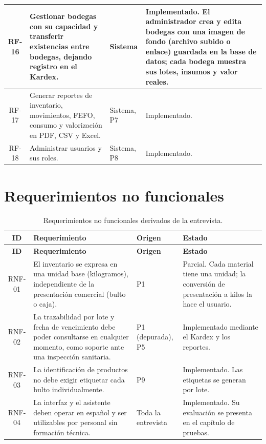 \begin{longtable}{|c|p{6.3cm}|p{1.9cm}|p{4.2cm}|}
RF-16 & Gestionar bodegas con su capacidad y transferir existencias entre bodegas, dejando registro en el Kardex. & Sistema & Implementado. El administrador crea y edita bodegas con una imagen de fondo (archivo subido o enlace) guardada en la base de datos; cada bodega muestra sus lotes, insumos y valor reales. \\ \hline
RF-17 & Generar reportes de inventario, movimientos, FEFO, consumo y valorización en PDF, CSV y Excel. & Sistema, P7 & Implementado. \\ \hline
RF-18 & Administrar usuarios y sus roles. & Sistema, P8 & Implementado. \\ \hline
\end{longtable}

\section{Requerimientos no funcionales}
\label{sec:req_rnf}

\begin{longtable}{|c|p{7.3cm}|p{1.6cm}|p{3.5cm}|}
\caption{Requerimientos no funcionales derivados de la entrevista.}
\label{tab:req_rnf}\\
\hline
\textbf{ID} & \textbf{Requerimiento} & \textbf{Origen} & \textbf{Estado} \\
\hline
\endfirsthead
\hline
\textbf{ID} & \textbf{Requerimiento} & \textbf{Origen} & \textbf{Estado} \\
\hline
\endhead
RNF-01 & El inventario se expresa en una unidad base (kilogramos), independiente de la presentación comercial (bulto o caja). & P1 & Parcial. Cada material tiene una unidad; la conversión de presentación a kilos la hace el usuario. \\ \hline
RNF-02 & La trazabilidad por lote y fecha de vencimiento debe poder consultarse en cualquier momento, como soporte ante una inspección sanitaria. & P1 (depurada), P5 & Implementado mediante el Kardex y los reportes. \\ \hline
RNF-03 & La identificación de productos no debe exigir etiquetar cada bulto individualmente. & P9 & Implementado. Las etiquetas se generan por lote. \\ \hline
RNF-04 & La interfaz y el asistente deben operar en español y ser utilizables por personal sin formación técnica. & Toda la entrevista & Implementado. Su evaluación se presenta en el capítulo de pruebas. \\ \hline
\end{longtable}

